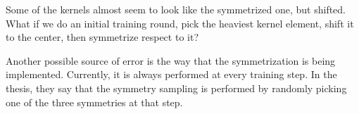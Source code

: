 \documentclass[12pt, two sided]{article}
\begin{document}
Some of the kernels almost seem to look like the symmetrized one, but shifted. What if we do an initial training round, pick the heaviest kernel element, shift it to the center, then symmetrize respect to it?

Another possible source of error is the way that the symmetrization is being implemented. Currently, it is always performed at every training step. In the thesis, they say that the symmetry sampling is performed by randomly picking one of the three symmetries at that step.












{} 
 \singlespacing


\doublespacing
\end{document}
